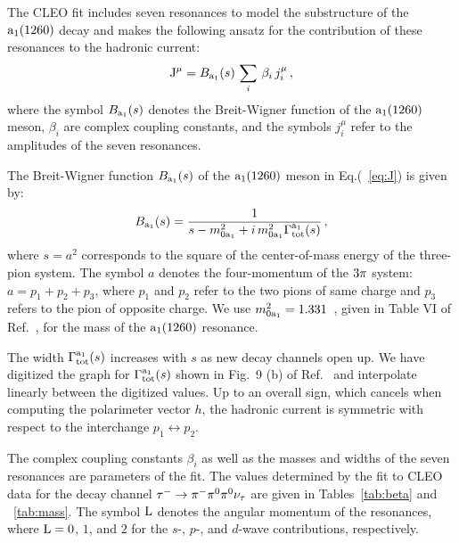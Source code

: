 The {\color{blue} CLEO} fit includes seven resonances to model the substructure of the $\textrm{a}_{1}\textrm{(1260)}$ decay and makes the following ansatz for the contribution of these resonances to the hadronic current:
\begin{equation}
\textrm{J}^{\mu} = B_{\textrm{a}_{1}}(s) \, \sum_{i} \, \beta_{i} \, j_{i}^{\mu} \, ,
\label{eq:J}
\end{equation}
where the symbol $B_{\textrm{a}_{1}}(s)$ denotes the Breit-Wigner function of the $\textrm{a}_{1}\textrm{(1260)}$ meson, $\beta_{i}$ are complex coupling constants, and the symbols $j_{i}^{\mu}$ refer to the amplitudes of the seven resonances.

The Breit-Wigner function $B_{\textrm{a}_{1}}(s)$ of the $\textrm{a}_{1}\textrm{(1260)}$ meson in Eq.(~\ref{eq:J}) is given by:
\begin{equation}
B_{\textrm{a}_{1}}(s) = \frac{1}{s - m_{0\textrm{a}_{1}}^{2} + i \, m_{0\textrm{a}_{1}}^{2} \Gamma_{\textrm{tot}}^{\textrm{a}_{1}}(s)} \, ,
\label{eq:Ba1}
\end{equation}
where $s = a^{2}$ corresponds to the square of the center-of-mass energy of the three-pion system.
The symbol $a$ denotes the four-momentum of the $3 \pi$ system: $a = p_{1} + p_{2} + p_{3}$,
where $p_{1}$ and $p_{2}$ refer to the two pions of same charge and $p_{3}$ refers to the pion of opposite charge.
We use $m_{0\textrm{a}_{1}}^{2} = 1.331$~\GeV, given in Table VI of Ref.~\cite{CLEO:1999rzk}, for the mass of the $\textrm{a}_{1}\textrm{(1260)}$ resonance.

The width $\Gamma_{\textrm{tot}}^{\textrm{a}_{1}}(s)$ increases with $s$ as new decay channels open up.
We have digitized the graph for $\Gamma_{\textrm{tot}}^{\textrm{a}_{1}}(s)$ shown in Fig.~9 (b) of Ref.~\cite{CLEO:1999rzk} and interpolate linearly between the digitized values.
Up to an overall sign, which cancels when computing the polarimeter vector $h$, the hadronic current is symmetric with respect to the interchange $p_{1} \leftrightarrow p_{2}$.

The complex coupling constants $\beta_{i}$ as well as the masses and widths of the seven resonances are parameters of the fit.
The values determined by the fit to CLEO data for the decay channel $\tau^{-} \to \pi^{-}\pi^{\textrm{0}}\pi^{\textrm{0}}\nu_{\tau}$ are given in Tables~\ref{tab:beta} and ~\ref{tab:mass}.
The symbol $\textrm{L}$ denotes the angular momentum of the resonances, where $\textrm{L}=0$, $1$, and $2$ for the $s$-, $p$-, and $d$-wave contributions, respectively.

